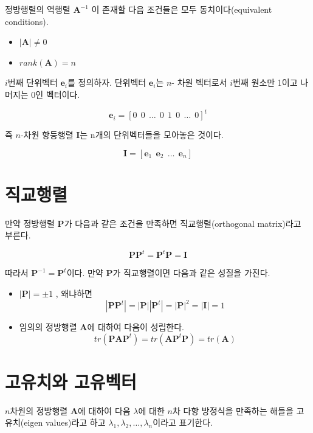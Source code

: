 \documentclass[
]{book}
\providecommand{\tightlist}{%
  \setlength{\itemsep}{0pt}\setlength{\parskip}{0pt}}
\newcommand{\bm}[1]{\boldsymbol{\mathbf{#1}}}
\theoremstyle{definition}
\theoremstyle{definition}
\theoremstyle{definition}
\theoremstyle{definition}
\theoremstyle{remark}
\begin{document}
정방행렬의 역행렬 \(\bm A^{-1}\) 이 존재할 다음 조건들은 모두 동치이다(equivalent conditions).

\begin{itemize}
\tightlist
\item
  \(|\bm A| \ne 0\)
\item
  \(rank(\bm A) = n\)
\end{itemize}

\(i\)번째 단위벡터 \(\bm e_i\)를 정의하자. 단위벡터 \(\bm e_i\)는 \(n\)- 차원 벡터로서 \(i\)번째 원소만 1이고 나머지는 0인 벡터이다.

\[ \bm e_i = [0 ~~0 ~~\dots~~ 0 ~~ 1 ~~ 0 ~~ \dots ~~ 0 ]^t \]

즉 \(n\)-차원 항등행렬 \(\bm I\)는 n개의 단위벡터들을 모아놓은 것이다.

\[  \bm I = [ \bm e_1 ~~ \bm e_2 ~~ \dots ~~ \bm e_n ] \]

\hypertarget{uxc9c1uxad50uxd589uxb82c}{%
\section{직교행렬}\label{uxc9c1uxad50uxd589uxb82c}}

만약 정방행렬 \(\bm P\)가 다음과 같은 조건을 만족하면 직교행렬(orthogonal matrix)라고 부른다.

\[  \bm P \bm P^t = \bm P^t \bm P = \bm I \]

따라서 \(\bm P^{-1} = \bm P^t\)이다. 만약 \(\bm P\)가 직교행렬이면 다음과 같은 성질을 가진다.

\begin{itemize}
\item
  \(| \bm P | = \pm 1\) , 왜냐하면
  \[  | \bm P \bm P^t | = | \bm P | |\bm P^t |  = | \bm P|^2 = |\bm I| =1 \]
\item
  임의의 정방행렬 \(\bm A\)에 대하여 다음이 성립한다.
  \[ tr(\bm P \bm A \bm P^t) = tr(\bm A \bm P^t \bm P) = tr(\bm A) \]
\end{itemize}

\hypertarget{uxace0uxc720uxce58uxc640-uxace0uxc720uxbca1uxd130}{%
\section{고유치와 고유벡터}\label{uxace0uxc720uxce58uxc640-uxace0uxc720uxbca1uxd130}}

\(n\)차원의 정방행렬 \(\bm A\)에 대하여 다음 \(\lambda\)에 대한 \(n\)차 다항 방정식을 만족하는 해들을 고유치(eigen values)라고 하고 \(\lambda_1, \lambda_2, \dots , \lambda_n\)이라고 표기한다.
\end{document}
